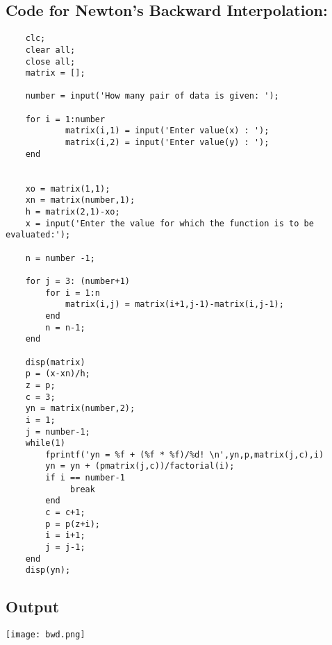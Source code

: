 \subsection*{Code for Newton's Backward Interpolation:}
\begin{verbatim}
    clc;
    clear all;
    close all;
    matrix = [];
    
    number = input('How many pair of data is given: ');
    
    for i = 1:number
            matrix(i,1) = input('Enter value(x) : ');
            matrix(i,2) = input('Enter value(y) : ');
    end
    
    
    xo = matrix(1,1);
    xn = matrix(number,1);
    h = matrix(2,1)-xo;
    x = input('Enter the value for which the function is to be evaluated:');
    
    n = number -1;
    
    for j = 3: (number+1)
        for i = 1:n
            matrix(i,j) = matrix(i+1,j-1)-matrix(i,j-1);
        end
        n = n-1;
    end
    
    disp(matrix)
    p = (x-xn)/h;
    z = p;
    c = 3;
    yn = matrix(number,2);
    i = 1;
    j = number-1;
    while(1)
        fprintf('yn = %f + (%f * %f)/%d! \n',yn,p,matrix(j,c),i)
        yn = yn + (pmatrix(j,c))/factorial(i);
        if i == number-1
             break
        end
        c = c+1;
        p = p(z+i);
        i = i+1;
        j = j-1; 
    end
    disp(yn);
\end{verbatim}

\subsection*{Output}
\begin{center}
    \centering
    \texttt{[image: bwd.png]}
\end{center}